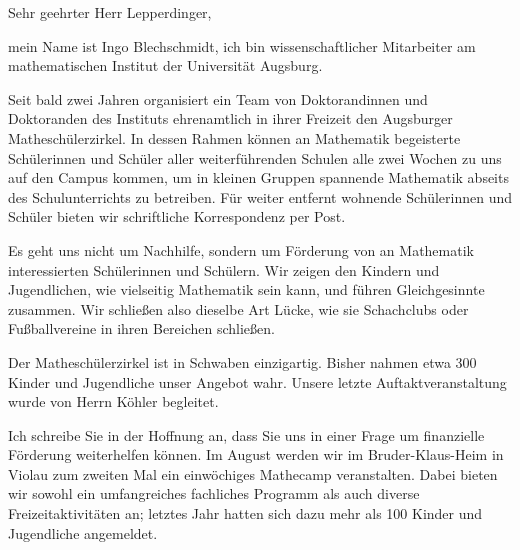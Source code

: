 \documentclass{../vorlagen/werbung/lehrerbriefe/zirkelbrief}
\begin{document}
\renewcommand{\anschrift}{%
      Herr Lepperdinger \\
      Hallstraße 10 \\
      86150 Augsburg}
\renewcommand{\datum}{\today}
\renewcommand{\betreff}{Matheschülerzirkel der Universität Augsburg}
\renewcommand{\absender}{%
      \textbf{Ingo Blechschmidt} \\
      \ \\
      Lehrstuhl für Algebra und Zahlentheorie \\
      Universitätsstr. 14 \\
      86159 Augsburg \\
      \ \\
      Telefon \> +49 (0) 821 598 -- 5601 \\
      Telefax \> +49 (0) 821 598 -- 2090 \\
      \textsf{blechschmidt@math.uni-augsburg.de} \\}

\makeletterhead

Sehr geehrter Herr Lepperdinger,

mein Name ist Ingo Blechschmidt, ich bin wissenschaftlicher Mitarbeiter
am mathematischen Institut der Universität Augsburg.

Seit bald zwei Jahren organisiert ein Team von Doktorandinnen und
Doktoranden des Instituts ehrenamtlich in ihrer Freizeit den Augsburger
Matheschülerzirkel. In dessen Rahmen können an Mathematik begeisterte
Schü\-ler\-in\-nen und Schüler aller weiterführenden Schulen alle zwei Wochen
zu uns auf den Campus kommen, um in kleinen Gruppen spannende Mathematik
abseits des Schulunterrichts zu betreiben. Für weiter entfernt wohnende
Schülerinnen und Schüler bieten wir schriftliche Korrespondenz per Post.

Es geht uns nicht um Nachhilfe, sondern um Förderung von an Mathematik
interessierten Schülerinnen und Schülern. Wir zeigen den Kindern und
Jugendlichen, wie vielseitig Mathematik sein kann, und führen
Gleichgesinnte zusammen. Wir schließen also dieselbe Art Lücke, wie sie
Schachclubs oder Fußballvereine in ihren Bereichen schließen.

Der Matheschülerzirkel ist in Schwaben einzigartig. Bisher nahmen etwa 300
Kinder und Jugendliche unser Angebot wahr. Unsere letzte
Auftaktveranstaltung wurde von Herrn Köhler begleitet.

Ich schreibe Sie in der Hoffnung an, dass Sie uns in einer Frage um
finanzielle Förderung weiterhelfen können. Im August werden wir im
Bruder-Klaus-Heim in Violau zum zweiten Mal ein einwöchiges Mathecamp
veranstalten. Dabei bieten wir sowohl ein umfangreiches fachliches
Programm als auch diverse Freizeitaktivitäten an; letztes Jahr hatten
sich dazu mehr als 100 Kinder und Jugendliche angemeldet.
\end{document}
